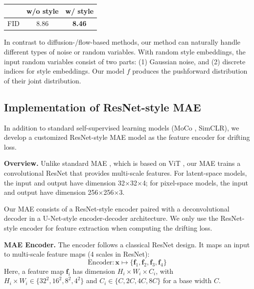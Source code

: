 \documentclass{article}
\newcommand{\tablestyle}[2]{\setlength{\tabcolsep}{#1}\renewcommand{\arraystretch}{#2}\centering
\small
}
\newcommand\tablefontsize{%
  \fontsize{8pt}{9pt}\selectfont
}
\renewcommand{\paragraph}[1]{\vspace{.05em}\noindent\textbf{#1}}
\theoremstyle{plain}
\theoremstyle{definition}
\theoremstyle{remark}
\begin{document}
\begin{center}
\tablestyle{6pt}{1.02}
\tablefontsize
\begin{tabular}{c|cc}
\toprule
 & w/o style & w/ style \\
\midrule
FID & 8.86 & \textbf{8.46} \\
\bottomrule
\end{tabular}
\end{center}

In contrast to diffusion-/flow-based methods, our method can naturally handle different types of noise or random variables.
With random style embeddings, the input random variables consist of two parts: (1) Gaussian noise, and (2) discrete indices for style embeddings. Our model $f$ produces the pushforward distribution of their joint distribution.

\subsection{Implementation of ResNet-style MAE}
\label{sec:appendix_latent_mae}

In addition to standard self-supervised learning models (MoCo \cite{he2020momentum}, SimCLR\cite{chen2020simple}), we develop a customized ResNet-style MAE model as the feature encoder for drifting loss.

\paragraph{Overview.}
Unlike standard MAE \cite{he2022masked}, which is based on ViT \cite{Dosovitskiy2021}, our MAE trains a convolutional ResNet that provides multi-scale features.
For latent-space models, the input and output have dimension 32$\times$32$\times$4;
for pixel-space models, the input and output have dimension 256$\times$256$\times$3.

Our MAE consists of a ResNet-style encoder paired with a deconvolutional decoder in a U-Net-style \cite{ronneberger2015u} encoder-decoder architecture.
We only use the ResNet-style encoder for feature extraction when computing the drifting loss.

\paragraph{MAE Encoder.}
The encoder follows a classical ResNet \cite{he2016deep} design.
It maps an input to multi-scale feature maps (4 scales in ResNet):
\[
\text{Encoder}: \mathbf{x} \mapsto \{\mathbf{f}_1, \mathbf{f}_2, \mathbf{f}_3, \mathbf{f}_4\}
\]
Here, a feature map $\mathbf{f}_i$ has dimension $H_i{\times}W_i{\times}C_i$, with $H_i{\times}W_i \in \{32^2, 16^2, 8^2, 4^2\}$ and $C_i \in \{C, 2C, 4C, 8C\}$ for a base width $C$.
\end{document}
